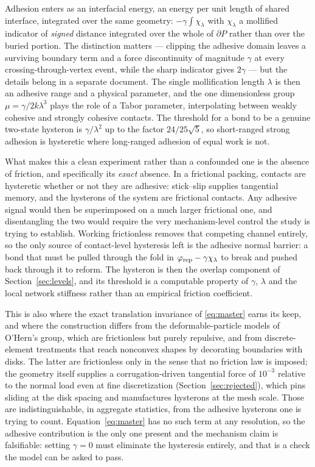 \documentclass[11pt]{article}
\begin{document}
Adhesion enters as an interfacial energy, an energy per unit length of shared interface, integrated over the same geometry: $-\gamma\int\chi_\lambda$ with $\chi_\lambda$ a mollified indicator of \emph{signed} distance integrated over the whole of $\partial P$ rather than over the buried portion. The distinction matters --- clipping the adhesive domain leaves a surviving boundary term and a force discontinuity of magnitude $\gamma$ at every crossing-through-vertex event, while the sharp indicator gives $2\gamma$ --- but the details belong in a separate document. The single mollification length $\lambda$ is then an adhesive range and a physical parameter, and the one dimensionless group $\mu = \gamma/2k\lambda^3$ plays the role of a Tabor parameter, interpolating between weakly cohesive and strongly cohesive contacts. The threshold for a bond to be a genuine two-state hysteron is $\gamma/\lambda^2$ up to the factor $24/25\sqrt5$, so short-ranged strong adhesion is hysteretic where long-ranged adhesion of equal work is not.

What makes this a clean experiment rather than a confounded one is the absence of friction, and specifically its \emph{exact} absence. In a frictional packing, contacts are hysteretic whether or not they are adhesive: stick--slip supplies tangential memory, and the hysterons of the system are frictional contacts. Any adhesive signal would then be superimposed on a much larger frictional one, and disentangling the two would require the very mechanism-level control the study is trying to establish. Working frictionless removes that competing channel entirely, so the only source of contact-level hysteresis left is the adhesive normal barrier: a bond that must be pulled through the fold in $\varphi_{\rm rep} - \gamma\chi_\lambda$ to break and pushed back through it to reform. The hysteron is then the overlap component of Section~\ref{sec:levels}, and its threshold is a computable property of $\gamma$, $\lambda$ and the local network stiffness rather than an empirical friction coefficient.

This is also where the exact translation invariance of \eqref{eq:master} earns its keep, and where the construction differs from the deformable-particle models of O'Hern's group, which are frictionless but purely repulsive, and from discrete-element treatments that reach nonconvex shapes by decorating boundaries with disks. The latter are frictionless only in the sense that no friction law is imposed; the geometry itself supplies a corrugation-driven tangential force of $10^{-3}$ relative to the normal load even at fine discretization (Section~\ref{sec:rejected}), which pins sliding at the disk spacing and manufactures hysterons at the mesh scale. Those are indistinguishable, in aggregate statistics, from the adhesive hysterons one is trying to count. Equation~\eqref{eq:master} has no such term at any resolution, so the adhesive contribution is the only one present and the mechanism claim is falsifiable: setting $\gamma = 0$ must eliminate the hysteresis entirely, and that is a check the model can be asked to pass.
\end{document}
